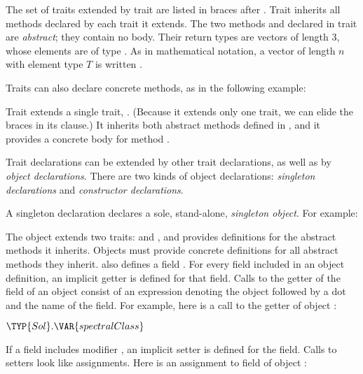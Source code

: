 \label{movingDim}


The set of traits extended by trait  are listed in braces after
. Trait  inherits all
methods declared by each trait it extends.
The two methods  and  declared in trait 
are \emph{abstract}; they contain no body.
Their return types are vectors of length 3, whose elements are
of type .
As in mathematical notation,
a vector of length $n$ with element type $T$ is written
.

Traits can also declare concrete methods,
as in the following example:

\label{fastDim}


Trait  extends a single trait, . (Because it extends
only one trait, we can elide the braces in its  clause.)
It inherits both abstract methods defined in , and it provides
a concrete body for method .

Trait declarations can be extended by other trait declarations,
as well as by \emph{object declarations}.
There are two kinds of object declarations:
\emph{singleton declarations} and
\emph{constructor declarations}.

A singleton declaration declares a sole, stand-alone, \emph{singleton object}.
For example:


The object  extends two traits:  and ,
and provides definitions for the abstract methods it inherits. Objects must
provide concrete definitions for all abstract methods they inherit. 
also defines a field .
For every field included in an object
definition, an implicit getter is defined for that field. Calls to
the getter of the field of an object consist of an expression
denoting the object
followed by a dot and the name of the field. For example, here is a call to the
getter  of object :



\begin{Fortress}
\(\TYP{Sol}.\VAR{spectralClass}\)
\end{Fortress}

If a field includes modifier ,
an implicit setter is defined for the
field. Calls to setters look like assignments.
Here is an assignment to field 
of object :

